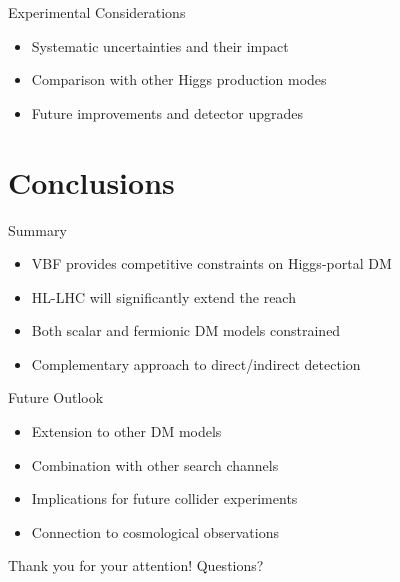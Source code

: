 \documentclass{../../bredelebeamer}
\begin{document}
\begin{frame}{Experimental Considerations}
    \begin{itemize}
        \item Systematic uncertainties and their impact
        \item Comparison with other Higgs production modes
        \item Future improvements and detector upgrades
    \end{itemize}
\end{frame}

\section{Conclusions}
\begin{frame}{Summary}
    \begin{itemize}
        \item VBF provides competitive constraints on Higgs-portal DM
        \item HL-LHC will significantly extend the reach
        \item Both scalar and fermionic DM models constrained
        \item Complementary approach to direct/indirect detection
    \end{itemize}
\end{frame}

\begin{frame}{Future Outlook}
    \begin{itemize}
        \item Extension to other DM models
        \item Combination with other search channels
        \item Implications for future collider experiments
        \item Connection to cosmological observations
    \end{itemize}
\end{frame}

\begin{frame}
    \centering
    \Huge Thank you for your attention!
    \vfill
    \Large Questions?
\end{frame}
\end{document}
